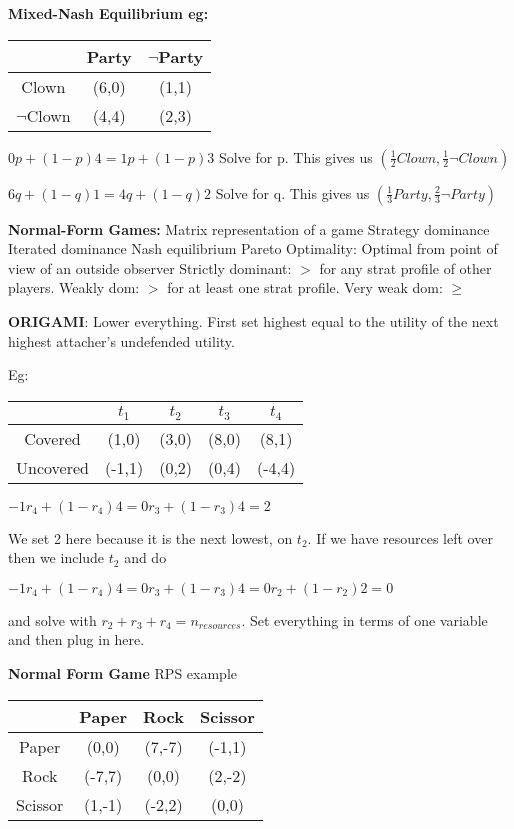 \documentclass[10pt,letter]{article}
\begin{document}
\begin{multicols}{2}
\textbf{Mixed-Nash Equilibrium eg:}

\begin{tabular}{|c|c|c|}
    \hline
    & Party & $\neg$Party\\\hline
    Clown & (6,0) & (1,1)\\\hline
    $\neg$Clown & (4,4) & (2,3)\\\hline
\end{tabular}

$0p + (1-p)4 = 1p + (1-p)3$ Solve for p. This gives us $(\frac12 Clown,\frac12\neg Clown)$

$6q + (1-q)1 = 4q + (1-q)2$ Solve for q. This gives us $(\frac13 Party, \frac23\neg Party)$

\textbf{Normal-Form Games:} Matrix representation of a game
Strategy dominance
Iterated dominance
Nash equilibrium
Pareto Optimality: Optimal from point of view of an outside observer
Strictly dominant: $>$ for any strat profile of other players. Weakly dom: $>$ for
at least one strat profile. Very weak dom: $\geq$

\textbf{ORIGAMI}: Lower everything. First set highest equal to the utility of 
the next highest attacher's undefended utility. 

Eg:
\begin{tabular}{|c|c|c|c|c|}
    \hline
     & $t_1$ & $t_2$ & $t_3$ & $t_4$\\\hline
     Covered & (1,0) & (3,0) & (8,0) & (8,1)\\\hline
     Uncovered & (-1,1) & (0,2) & (0,4) & (-4,4)\\\hline
\end{tabular}

$ -1r_4 + (1-r_4)4 = 0r_3 + (1-r_3)4 = 2$

We set 2 here because it is the next lowest, on $t_2$. If we have resources 
left over then we include $t_2$ and do

$ -1r_4 + (1-r_4)4 = 0r_3 + (1-r_3)4 = 0r_2 + (1-r_2)2 = 0$

and solve with $r_2 + r_3 + r_4 = n_{resources}$. Set everything in terms of one
variable and then plug in here.

\textbf{Normal Form Game} RPS example

\begin{tabular}{|c|c|c|c|}
    \hline
    & Paper & Rock & Scissor\\\hline
    Paper & (0,0) & (7,-7) & (-1,1)\\\hline
    Rock & (-7,7) & (0,0) & (2,-2)\\\hline
    Scissor & (1,-1) & (-2,2) & (0,0)\\\hline
\end{tabular}


\end{multicols}
\end{document}
